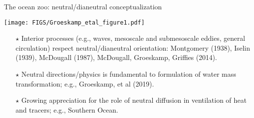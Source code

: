 \documentclass{beamer}
\begin{document}
\begin{frame}{The ocean zoo: neutral/dianeutral conceptualization}

\centering
\texttt{[image: FIGS/Groeskamp\_etal\_figure1.pdf]}

\begin{itemize}
    \item[$\star$] Interior processes (e.g., waves, mesoscale and submesoscale eddies, general circulation) respect neutral/dianeutral orientation: Montgomery (1938), Iselin (1939), McDougall (1987), McDougall, Groeskamp, Griffies (2014).
    \item[$\star$]  Neutral directions/physics is fundamental to formulation of water mass transformation; e.g., Groeskamp, et al (2019).
    \item[$\star$] Growing appreciation for the role of neutral diffusion in ventilation of heat and tracers; e.g., Southern Ocean. 
    
    \end{itemize}


\end{frame}
\end{document}
